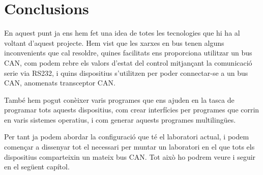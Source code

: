 

\section{Conclusions}\label{cap:tec:conc}

En aquest punt ja ens hem fet una idea de totes les tecnologies que hi ha al voltant d'aquest projecte. Hem vist que les xarxes en bus tenen alguns inconvenients que cal resoldre, quines facilitats ens proporciona utilitzar un bus CAN, com podem rebre els valors d'estat del control mitjançant la comunicació serie via RS232, i quins dispositius s'utilitzen per poder connectar-se a un bus CAN, anomenats transceptor CAN.

També hem pogut conèixer varis programes que ens ajuden en la tasca de programar tots aquests dispositius, com crear interfícies per programes que corrin en varis sistemes operatius, i com generar aquests programes multilingües.

Per tant ja podem abordar la configuració que té el laboratori actual, i podem començar a dissenyar tot el necessari per muntar un laboratori en el que tots els dispositius comparteixin un mateix bus CAN. Tot això ho podrem veure i seguir en el següent capítol.
